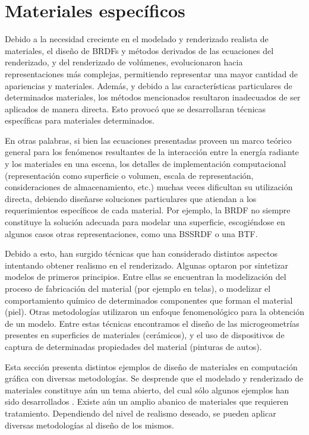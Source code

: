 \section{Materiales específicos}
Debido a la necesidad creciente en el modelado y renderizado realista de materiales, el diseño de BRDFs y métodos derivados de las ecuaciones del renderizado, y del renderizado de volúmenes, evolucionaron hacia representaciones más complejas, permitiendo representar una mayor cantidad de apariencias y materiales.
Además, y debido a las características particulares de determinados materiales, los métodos mencionados resultaron inadecuados de ser aplicados de manera directa.
Esto provocó que se desarrollaran técnicas específicas para materiales determinados.

En otras palabras, si bien las ecuaciones presentadas proveen un marco teórico general para los fenómenos resultantes de la interacción entre la energía radiante y los materiales en una escena, los detalles de implementación computacional (representación como superficie o volumen, escala de representación, consideraciones de almacenamiento, etc.) muchas veces dificultan su utilización directa, debiendo diseñarse soluciones particulares que atiendan a los requerimientos específicos de cada material.
Por ejemplo, la BRDF no siempre constituye la solución adecuada para modelar una superficie, escogiéndose en algunos casos otras representaciones, como una BSSRDF o una BTF.

Debido a esto, han surgido técnicas que han considerado distintos aspectos intentando obtener realismo en el renderizado.
Algunas optaron por sintetizar modelos de primeros principios. 
Entre ellas se encuentran la modelización del proceso de fabricación del material (por ejemplo en telas), o modelizar el comportamiento químico de determinados componentes que forman el material (piel).
Otras metodologías utilizaron un enfoque fenomenológico para la obtención de un modelo.
Entre estas técnicas encontramos el diseño de las microgeometrías presentes en superficies de materiales (cerámicos), y el uso de dispositivos de captura de determinadas propiedades del material (pinturas de autos). 


Esta sección presenta distintos ejemplos de diseño de materiales en computación gráfica con diversas metodologías.
Se desprende que el modelado y renderizado de materiales constituye aún un tema abierto, del cual sólo algunos ejemplos han sido desarrollados \cite{Dorsey2007}.
Existe aún un amplio abanico de materiales que requieren tratamiento.
Dependiendo del nivel de realismo deseado, se pueden aplicar diversas metodologías al diseño de los mismos.



